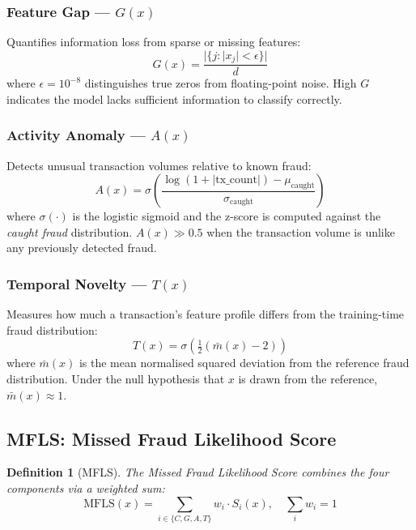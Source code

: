 \documentclass[journal]{IEEEtran}
\newcommand{\MFLS}{\mathrm{MFLS}}
\newtheorem{definition}{Definition}
\begin{document}
\subsubsection{Feature Gap --- $G(x)$}
Quantifies information loss from sparse or missing features:
\begin{equation}
  G(x) = \frac{|\{j : |x_j| < \epsilon\}|}{d}
  \label{eq:feature_gap}
\end{equation}
where $\epsilon = 10^{-8}$ distinguishes true zeros from floating-point noise. High $G$ indicates the model lacks sufficient information to classify correctly.

\subsubsection{Activity Anomaly --- $A(x)$}
Detects unusual transaction volumes relative to known fraud:
\begin{equation}
  A(x) = \sigma\!\left(\frac{\log(1 + |\text{tx\_count}|) - \mu_{\text{caught}}}{\sigma_{\text{caught}}}\right)
  \label{eq:activity}
\end{equation}
where $\sigma(\cdot)$ is the logistic sigmoid and the z-score is computed against the \textit{caught fraud} distribution. $A(x) \gg 0.5$ when the transaction volume is unlike any previously detected fraud.

\subsubsection{Temporal Novelty --- $T(x)$}
Measures how much a transaction's feature profile differs from the training-time fraud distribution:
\begin{equation}
  T(x) = \sigma\!\left(\tfrac{1}{2}(\bar{m}(x) - 2)\right)
  \label{eq:temporal}
\end{equation}
where $\bar{m}(x)$ is the mean normalised squared deviation from the reference fraud distribution. Under the null hypothesis that $x$ is drawn from the reference, $\bar{m}(x) \approx 1$.

\subsection{MFLS: Missed Fraud Likelihood Score}
\label{ssec:mfls}

\begin{definition}[MFLS]
The Missed Fraud Likelihood Score combines the four components via a weighted sum:
\begin{equation}
  \MFLS(x) = \sum_{i \in \{C,G,A,T\}} w_i \cdot S_i(x), \quad \sum_i w_i = 1
  \label{eq:mfls}
\end{equation}
\end{definition}
\end{document}
